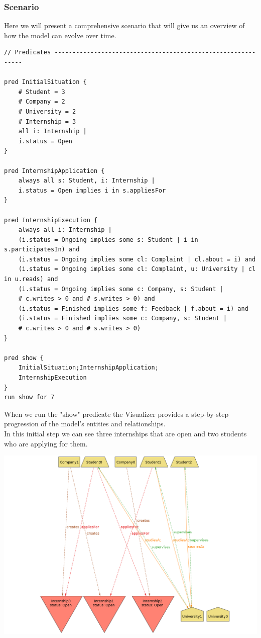 \documentclass[11pt,twoside]{article}
\begin{document}
	\subsubsection{Scenario}
Here we will present a comprehensive scenario that will give us an overview of how the model can evolve over time.
{\small
\begin{verbatim}
// Predicates -------------------------------------------------------------

pred InitialSituation {
    # Student = 3
    # Company = 2
    # University = 2
    # Internship = 3
    all i: Internship |
    i.status = Open
}

pred InternshipApplication {
    always all s: Student, i: Internship |
    i.status = Open implies i in s.appliesFor
}

pred InternshipExecution {
    always all i: Internship |
    (i.status = Ongoing implies some s: Student | i in s.participatesIn) and
    (i.status = Ongoing implies some cl: Complaint | cl.about = i) and
    (i.status = Ongoing implies some cl: Complaint, u: University | cl in u.reads) and
    (i.status = Ongoing implies some c: Company, s: Student | 
    # c.writes > 0 and # s.writes > 0) and
    (i.status = Finished implies some f: Feedback | f.about = i) and
    (i.status = Finished implies some c: Company, s: Student | 
    # c.writes > 0 and # s.writes > 0)
}

pred show {
    InitialSituation;InternshipApplication;
    InternshipExecution
}
run show for 7
\end{verbatim}}
When we run the "show" predicate the Visualizer provides a step-by-step progression of the model's entities and relationships. \\
In this initial step we can see three internships that are open and two students who are applying for them.
\begin{center}
\includegraphics[width=\textwidth]{Images/Scene_step0}
\end{center}
\end{document}
